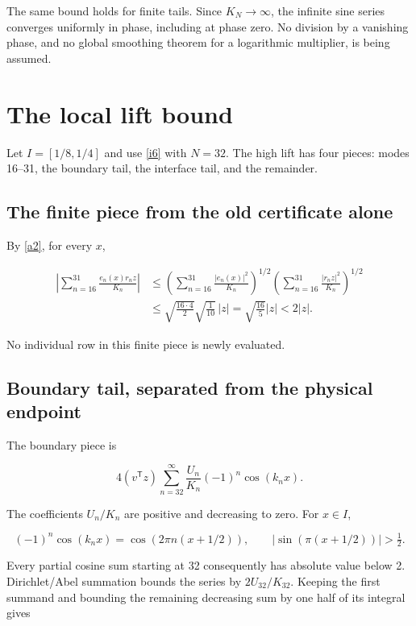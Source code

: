 \documentclass[11pt]{article}
\begin{document}
The same bound holds for finite tails. Since \(K_N\to\infty\), the infinite sine series converges uniformly in phase, including at phase zero. No division by a vanishing phase, and no global smoothing theorem for a logarithmic multiplier, is being assumed.

\section{The local lift bound}

Let \(I=[1/8,1/4]\) and use \eqref{i6} with \(N=32\). The high lift has four pieces: modes 16--31, the boundary tail, the interface tail, and the remainder.

\subsection{The finite piece from the old certificate alone}

By \eqref{a2}, for every \(x\),

\begin{equation}\label{i12}
\begin{split}
 \left|\sum_{n=16}^{31}\frac{e_n(x)r_nz}{K_n}\right|
 &\le\left(\sum_{n=16}^{31}\frac{|e_n(x)|^2}{K_n}\right)^{1/2}
       \left(\sum_{n=16}^{31}\frac{|r_nz|^2}{K_n}\right)^{1/2}\\
 &\le\sqrt{\frac{16\cdot4}{2}}\sqrt{\frac1{10}}\,|z|
 =\sqrt{\frac{16}5}|z|<2|z|.
 \end{split}
\end{equation}

No individual row in this finite piece is newly evaluated.

\subsection{Boundary tail, separated from the physical endpoint}

The boundary piece is

\[
 4(v^{\mathsf T}z)\sum_{n=32}^{\infty}
        \frac{U_n}{K_n}(-1)^n\cos(k_nx).
\]

The coefficients \(U_n/K_n\) are positive and decreasing to zero. For \(x\in I\),

\[
 (-1)^n\cos(k_nx)=\cos(2\pi n(x+1/2)),\qquad
 |\sin(\pi(x+1/2))|>\tfrac12.
\]

Every partial cosine sum starting at 32 consequently has absolute value below 2. Dirichlet/Abel summation bounds the series by \(2U_{32}/K_{32}\). Keeping the first summand and bounding the remaining decreasing sum by one half of its integral gives
\end{document}
